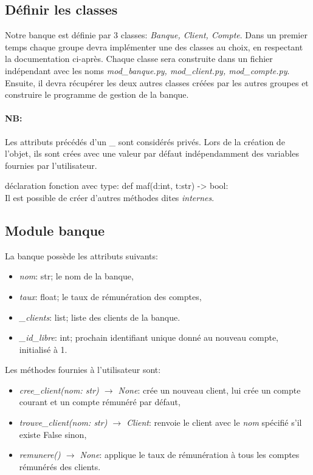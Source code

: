 \documentclass[a4paper,11pt]{article}
\begin{document}
\begin{Form}
\section{Définir les classes}
Notre banque est définie par 3 classes: \emph{Banque, Client, Compte}. Dans un premier temps chaque groupe devra implémenter une des classes au choix, en respectant la documentation ci-après. Chaque classe sera construite dans un fichier indépendant avec les noms \emph{mod\_banque.py, mod\_client.py, mod\_compte.py}. Ensuite, il devra récupérer les deux autres classes créées par les autres groupes et construire le programme de gestion de la banque.
\paragraph{NB:}Les attributs précédés d'un \_ sont considérés privés. Lors de la création de l'objet, ils sont crées avec une valeur par défaut indépendamment des variables fournies par l'utilisateur. 
\begin{commentprof}
déclaration fonction avec type:
def maf(d:int, t:str) -> bool:
\\Il est possible de créer d'autres méthodes dites \emph{internes}.
\end{commentprof}
\subsection{Module banque}
La banque possède les attributs suivants:
\begin{itemize}
\item \emph{nom}: str; le nom de la banque,
\item \emph{taux}: float; le taux de rémunération des comptes,
\item \emph{\_clients}: list; liste des clients de la banque.
\item \emph{\_id\_libre}: int; prochain identifiant unique donné au nouveau compte, initialisé à 1.
\end{itemize}
Les méthodes fournies à l'utilisateur sont:
\begin{itemize}
\item\emph{cree\_client(nom: str) $\rightarrow$ None}: crée un nouveau client, lui crée un compte courant et un compte rémunéré par défaut,
\item \emph{trouve\_client(nom: str) $\rightarrow$ Client}: renvoie le client avec le \emph{nom} spécifié s'il existe False sinon,
\item \emph{remunere() $\rightarrow$ None}: applique le taux de rémunération à tous les comptes rémunérés des clients.
\end{itemize}

\end{Form}
\end{document}
